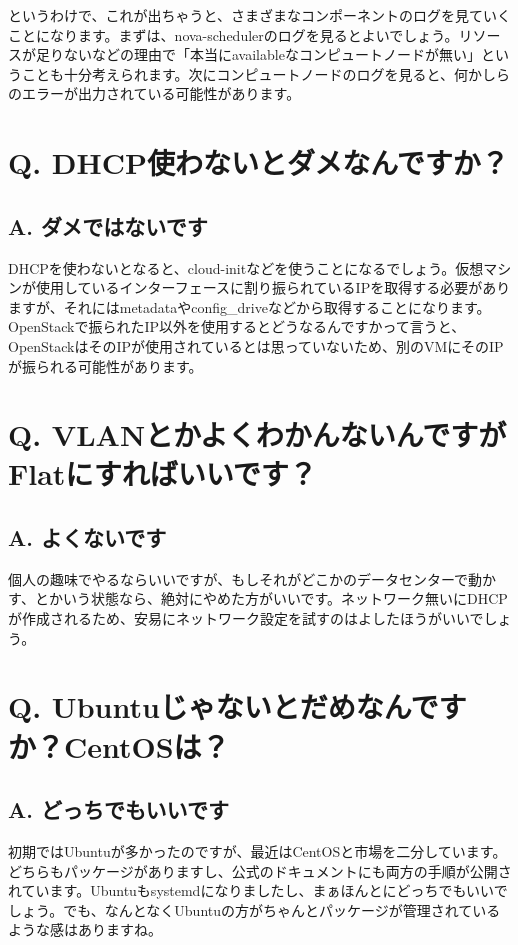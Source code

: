 \documentclass[9pt,b5paper,tombo,openany]{jsbook}
\begin{document}
というわけで、これが出ちゃうと、さまざまなコンポーネントのログを見ていくことになります。まずは、nova-schedulerのログを見るとよいでしょう。リソースが足りないなどの理由で「本当にavailableなコンピュートノードが無い」ということも十分考えられます。次にコンピュートノードのログを見ると、何かしらのエラーが出力されている可能性があります。

\section*{Q. DHCP使わないとダメなんですか？}
\subsection*{A. ダメではないです}
DHCPを使わないとなると、cloud-initなどを使うことになるでしょう。仮想マシンが使用しているインターフェースに割り振られているIPを取得する必要がありますが、それにはmetadataやconfig\_driveなどから取得することになります。OpenStackで振られたIP以外を使用するとどうなるんですかって言うと、OpenStackはそのIPが使用されているとは思っていないため、別のVMにそのIPが振られる可能性があります。

\section*{Q. VLANとかよくわかんないんですがFlatにすればいいです？}
\subsection*{A. よくないです}
個人の趣味でやるならいいですが、もしそれがどこかのデータセンターで動かす、とかいう状態なら、絶対にやめた方がいいです。ネットワーク無いにDHCPが作成されるため、安易にネットワーク設定を試すのはよしたほうがいいでしょう。

\section*{Q. Ubuntuじゃないとだめなんですか？CentOSは？}
\subsection*{A. どっちでもいいです}
初期ではUbuntuが多かったのですが、最近はCentOSと市場を二分しています。どちらもパッケージがありますし、公式のドキュメントにも両方の手順が公開されています。Ubuntuもsystemdになりましたし、まぁほんとにどっちでもいいでしょう。でも、なんとなくUbuntuの方がちゃんとパッケージが管理されているような感はありますね。
\end{document}
